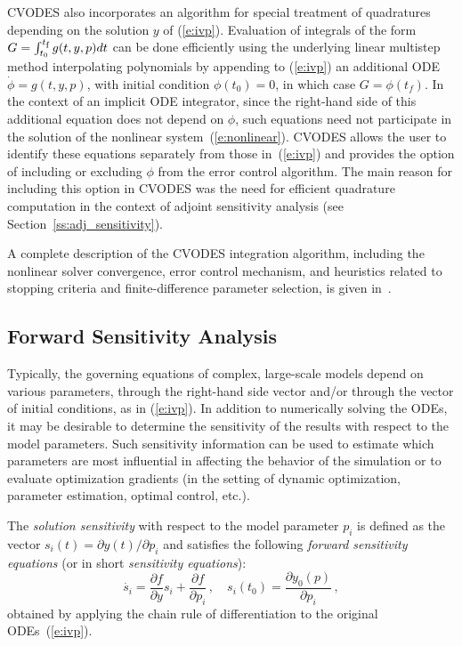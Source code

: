 CVODES also incorporates an algorithm for special treatment of
quadratures depending on the solution $y$ of (\ref{e:ivp}).
Evaluation of integrals of the form
$G = \int_{t_0}^{t_\mb{f}} g(t,y,p) dt$ can be done efficiently using the
underlying linear multistep method interpolating polynomials by
appending to (\ref{e:ivp}) an additional ODE
$\dot\phi = g(t,y,p)$, with initial condition $\phi(t_0) = 0$,
in which case $G = \phi(t_f)$. In the context of an implicit ODE
integrator, since the right-hand side of this additional equation does not
depend on $\phi$, such equations need not participate in the solution of
the nonlinear system~(\ref{e:nonlinear}). CVODES allows the user to
identify these equations separately from those in~(\ref{e:ivp}) and
provides the option of including or excluding $\phi$ from the error
control algorithm.
The main reason for including this option in CVODES was the need for
efficient quadrature computation in the context of adjoint sensitivity 
analysis (see Section~\ref{ss:adj_sensitivity}).

A complete description of the CVODES integration algorithm, including 
the nonlinear solver convergence, error control mechanism, and heuristics 
related to stopping criteria and finite-difference parameter selection, is
given in~\cite{HBGLSSW:04}.


\subsection{Forward Sensitivity Analysis}\label{ss:fwd_sensitivity}

Typically, the governing equations of complex, large-scale models
depend on various parameters,  through the right-hand side vector 
and/or through the vector of initial conditions, as in (\ref{e:ivp}).
In addition to numerically solving the ODEs, it may be desirable to
determine the sensitivity of the results with respect to the model
parameters. 
Such sensitivity information can be used to estimate which
parameters are most influential in affecting the behavior of the
simulation or to evaluate optimization gradients (in the setting of dynamic
optimization, parameter estimation, optimal control, etc.).

The {\em solution sensitivity} with respect to the model parameter
$p_i$ is defined as the vector 
$s_i (t) = {\partial y(t)}/{\partial p_i}$
and satisfies the following {\em forward sensitivity equations}
(or in short {\em sensitivity equations}):
\begin{equation}\label{e:sens_eqns}
\dot{s_i}  = \frac{\partial f}{\partial y} s_i + \frac{\partial f}{\partial p_i} \, ,
\quad s_i(t_0)  = \frac{\partial y_{0}(p)}{\partial p_i} \, ,
\end{equation}
obtained by applying the chain rule of differentiation to the original
ODEs~(\ref{e:ivp}). 

